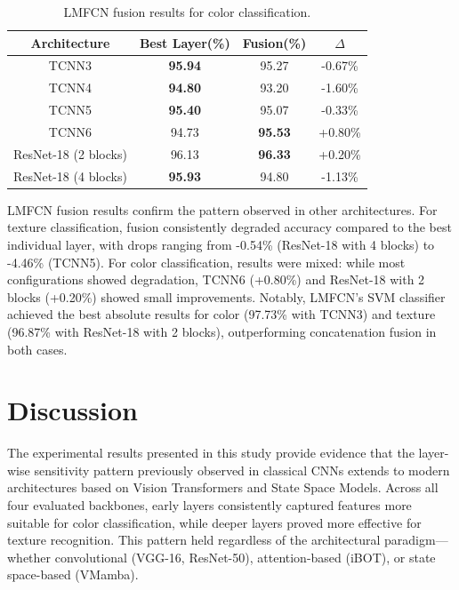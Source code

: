 \documentclass[conference]{IEEEtran}
\begin{document}
\begin{table}[htbp]
\caption{LMFCN fusion results for color classification.}
\begin{center}
\begin{tabular}{c|c|c|c}
\hline
\textbf{Architecture} & \textbf{Best Layer(\%)} & \textbf{Fusion(\%)} & \textbf{$\Delta$}\\
\hline
TCNN3 & \textbf{95.94} & 95.27 & -0.67\% \\
TCNN4 & \textbf{94.80} & 93.20 & -1.60\% \\
TCNN5 & \textbf{95.40} & 95.07 & -0.33\% \\
TCNN6 & 94.73 & \textbf{95.53} & +0.80\% \\
ResNet-18 (2 blocks) & 96.13 & \textbf{96.33} & +0.20\% \\
ResNet-18 (4 blocks) & \textbf{95.93} & 94.80 & -1.13\% \\
\hline
\end{tabular}
\label{tab10}
\end{center}
\end{table}

LMFCN fusion results confirm the pattern observed in other architectures. For texture classification, fusion consistently degraded accuracy compared to the best individual layer, with drops ranging from -0.54\% (ResNet-18 with 4 blocks) to -4.46\% (TCNN5). For color classification, results were mixed: while most configurations showed degradation, TCNN6 (+0.80\%) and ResNet-18 with 2 blocks (+0.20\%) showed small improvements. Notably, LMFCN's SVM classifier achieved the best absolute results for color (97.73\% with TCNN3) and texture (96.87\% with ResNet-18 with 2 blocks), outperforming concatenation fusion in both cases.


\section{Discussion}

The experimental results presented in this study provide evidence that the layer-wise sensitivity pattern previously observed in classical CNNs extends to modern architectures based on Vision Transformers and State Space Models. Across all four evaluated backbones, early layers consistently captured features more suitable for color classification, while deeper layers proved more effective for texture recognition. This pattern held regardless of the architectural paradigm---whether convolutional (VGG-16, ResNet-50), attention-based (iBOT), or state space-based (VMamba).
\end{document}
